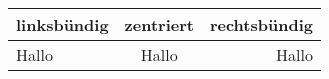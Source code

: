 \begin{tabular}{|lc|r|}
	\hline
	linksbündig & zentriert & rechtsbündig \\ \hline
	Hallo       & Hallo     & Hallo        \\ \hline
\end{tabular} 
